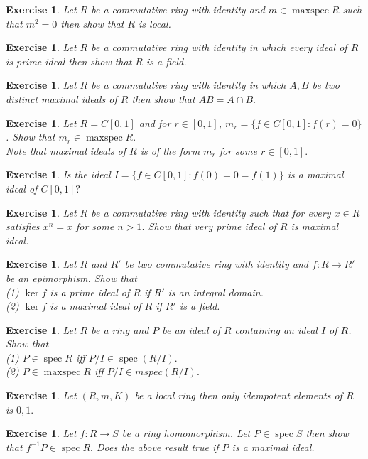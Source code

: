 \documentclass[11pt]{amsart}
\newtheorem{ex}[theorem]{Exercise}
\DeclareMathOperator{\spec}{\text{spec}}
\DeclareMathOperator{\mspec}{\text{maxspec}}
\begin{document}
\begin{ex}
Let $R$ be a commutative ring with identity and $m\in \mspec R$ such that $m^2=0$ then show that $R$ is local.
\end{ex}
\begin{ex}
Let $R$ be a commutative ring with identity in which every ideal of $R$ is prime ideal then show that $R$ is a field.
\end{ex}
\begin{ex}
Let $R$ be a commutative ring with identity in which $A,B$ be two distinct maximal ideals of $R$ then show that $AB=A\cap B.$
\end{ex}
\begin{ex}
Let $R=C[0,1]$ and for $r\in [0,1]$, $m_r=\{f\in C[0,1]:f(r)=0\}$. Show that $m_r\in \mspec R.$\\
Note that maximal ideals of $R$ is of the form $m_r$ for some $r\in [0,1].$
\end{ex}
\begin{ex}
Is the ideal $I=\{f\in C[0,1]:f(0)=0=f(1)\}$ is a maximal ideal of $C[0,1]?$
\end{ex}
\begin{ex}
Let $R$ be a commutative ring with identity such that for every $x\in R$ satisfies $x^n=x$ for some $n>1$. Show that very prime ideal of $R$ is maximal ideal.
\end{ex}
\begin{ex}
Let $R$ and $R'$ be two commutative ring with identity and $f:R\to R'$ be an epimorphism. Show that\\
(1) $\ker f$ is a prime ideal of $R$ if $R'$ is an integral domain.\\
(2) $\ker f$ is a maximal ideal of $R$ if $R'$ is a field.
\end{ex}
\begin{ex}
Let $R$ be a ring and $P$ be an ideal of $R$ containing an ideal $I$ of $R$. Show that\\
(1) $P\in \spec R$ iff $P/I\in \spec (R/I).$\\
(2) $P\in \mspec R$ iff $P/I \in mspec (R/I).$
\end{ex}
\begin{ex}
Let $(R,m,K)$  be a local ring then only idempotent elements of $R$ is $0,1.$
\end{ex}
\begin{ex}
Let $f:R\to S$ be a ring homomorphism. Let $P\in \spec S$ then show that $f^{-1}P\in \spec R.$ Does the above result true if $P$ is a maximal ideal.
\end{ex}
\end{document}
